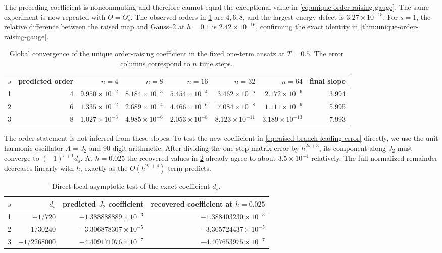 \documentclass[11pt,a4paper]{article}
\begin{document}
The preceding coefficient is noncommuting and therefore cannot equal the
exceptional value in \cref{eq:unique-order-raising-gauge}.  The same
experiment is now repeated with \(\Theta=\Theta_s^\star\).  The observed
orders in \cref{tab:order-raising-gauge} are \(4,6,8\), and the largest
energy defect is \(3.27\times10^{-15}\).  For \(s=1\), the relative
difference between the raised map and Gauss--2 at \(h=0.1\) is
\(2.42\times10^{-16}\), confirming the exact identity in
\cref{thm:unique-order-raising-gauge}.

\begin{table}[H]
\centering
\scriptsize
\caption{Global convergence of the unique order-raising coefficient in
the fixed one-term ansatz at \(T=0.5\).  The error columns correspond to
\(n\) time steps.}
\label{tab:order-raising-gauge}
\begin{tabular}{@{}crrrrrrr@{}}
\toprule
\(s\) & predicted order & \(n=4\) & \(n=8\) & \(n=16\) & \(n=32\)
& \(n=64\) & final slope \\ \midrule
1 & 4 & \(9.950\!\times10^{-2}\) & \(8.184\!\times10^{-3}\)
& \(5.454\!\times10^{-4}\) & \(3.462\!\times10^{-5}\)
& \(2.172\!\times10^{-6}\) & 3.994\\
2 & 6 & \(1.335\!\times10^{-2}\) & \(2.689\!\times10^{-4}\)
& \(4.466\!\times10^{-6}\) & \(7.084\!\times10^{-8}\)
& \(1.111\!\times10^{-9}\) & 5.995\\
3 & 8 & \(1.027\!\times10^{-3}\) & \(4.985\!\times10^{-6}\)
& \(2.053\!\times10^{-8}\) & \(8.123\!\times10^{-11}\)
& \(3.189\!\times10^{-13}\) & 7.993\\
\bottomrule
\end{tabular}
\end{table}

The order statement is not inferred from these slopes.  To test the new
coefficient in \cref{eq:raised-branch-leading-error} directly, we use the
unit harmonic oscillator \(A=J_2\) and 90-digit arithmetic.  After
dividing the one-step matrix error by \(h^{2s+3}\), its component along
\(J_2\) must converge to \((-1)^{s+1}d_s\).  At \(h=0.025\) the recovered
values in \cref{tab:direct-ds-coefficient} already agree to about
\(3.5\times10^{-4}\) relatively.  The full normalized remainder decreases
linearly with \(h\), exactly as the \(O(h^{2s+4})\) term predicts.

\begin{table}[htbp]
\centering
\caption{Direct local asymptotic test of the exact coefficient \(d_s\).}
\label{tab:direct-ds-coefficient}
\begin{tabular}{@{}crrr@{}}
\toprule
\(s\) & \(d_s\) & predicted \(J_2\) coefficient
& recovered coefficient at \(h=0.025\) \\ \midrule
1 & \(-1/720\) & \(-1.388888889\times10^{-3}\)
& \(-1.388403230\times10^{-3}\)\\
2 & \(1/30240\) & \(-3.306878307\times10^{-5}\)
& \(-3.305724437\times10^{-5}\)\\
3 & \(-1/2268000\) & \(-4.409171076\times10^{-7}\)
& \(-4.407653975\times10^{-7}\)\\
\bottomrule
\end{tabular}
\end{table}
\end{document}
